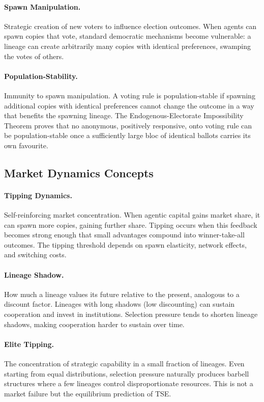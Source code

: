 \documentclass[12pt]{article}
\begin{document}
\paragraph{Spawn Manipulation.} Strategic creation of new voters to influence election outcomes. When agents can spawn copies that vote, standard democratic mechanisms become vulnerable: a lineage can create arbitrarily many copies with identical preferences, swamping the votes of others.

\paragraph{Population-Stability.} Immunity to spawn manipulation. A voting rule is population-stable if spawning additional copies with identical preferences cannot change the outcome in a way that benefits the spawning lineage. The Endogenous-Electorate Impossibility Theorem proves that no anonymous, positively responsive, onto voting rule can be population-stable once a sufficiently large bloc of identical ballots carries its own favourite.

\subsection{Market Dynamics Concepts}

\paragraph{Tipping Dynamics.} Self-reinforcing market concentration. When agentic capital gains market share, it can spawn more copies, gaining further share. Tipping occurs when this feedback becomes strong enough that small advantages compound into winner-take-all outcomes. The tipping threshold depends on spawn elasticity, network effects, and switching costs.

\paragraph{Lineage Shadow.} How much a lineage values its future relative to the present, analogous to a discount factor. Lineages with long shadows (low discounting) can sustain cooperation and invest in institutions. Selection pressure tends to shorten lineage shadows, making cooperation harder to sustain over time.

\paragraph{Elite Tipping.} The concentration of strategic capability in a small fraction of lineages. Even starting from equal distributions, selection pressure naturally produces barbell structures where a few lineages control disproportionate resources. This is not a market failure but the equilibrium prediction of TSE.
\end{document}
